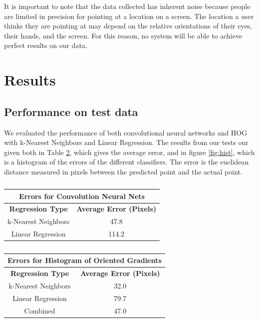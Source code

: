 \documentclass[10pt,twocolumn,letterpaper]{article}
\begin{document}
It is important to note that the data collected has inherent noise because people are limited in precision for pointing at a location on a screen.  The location a user thinks they are pointing at may depend on the relative orientations of their eyes, their hands, and the screen.  For this reason, no system will be able to achieve perfect results on our data.

\section{Results}

\subsection{Performance on test data}
We evaluated the performance of both convolutional neural networks and HOG with k-Nearest Neighbors and Linear Regression. The results from our tests our given both in Table \ref{table:meanErrors}, which gives the average error, and in figure \ref{fig:hist}, which is a histogram of the errors of the different classifiers. The error is the euclidean distance measured in pixels between the predicted point and the actual point.

\begin{table}
	\caption{}
	\begin{center}
		\begin{tabular}{|c|c|}
			\hline
			\multicolumn{2}{|c|}{\textbf{Errors for Convolution Neural Nets}}\\\hline
			\textbf{Regression Type} & \textbf{Average Error (Pixels)} \\\hline
			k-Nearest Neighbors & 47.8 \\\hline
			Linear Regression &  114.2 \\\hline	
		\end{tabular}
		\begin{tabular}{|c|c|}
			\hline
			\multicolumn{2}{|c|}{\textbf{Errors for Histogram of Oriented Gradients}} \\\hline
			\textbf{Regression Type} & \textbf{Average Error (Pixels)} \\\hline
			k-Nearest Neighbors & 32.0\\\hline
			Linear Regression & 79.7 \\\hline
			Combined & 47.0 \\\hline
		\end{tabular}
	\end{center}
	\label{table:meanErrors}
\end{table}
\end{document}
